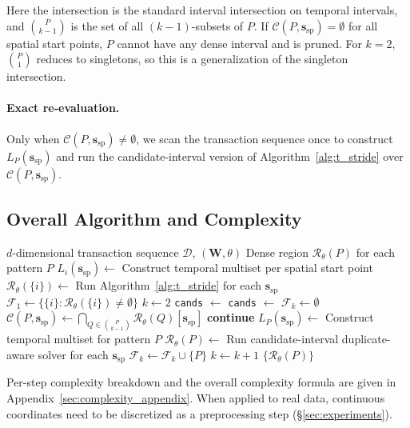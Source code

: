 Here the intersection is the standard interval intersection
on temporal intervals, and $\binom{P}{k-1}$ is the set of all
$(k{-}1)$-subsets of $P$.
If $\mathcal{C}(P,\bm{s}_{\mathrm{sp}})=\emptyset$
for all spatial start points,
$P$ cannot have any dense interval and is pruned.
For $k=2$, $\binom{P}{1}$ reduces to singletons,
so this is a generalization of the singleton intersection.

\paragraph{Exact re-evaluation.}
Only when $\mathcal{C}(P,\bm{s}_{\mathrm{sp}}) \neq \emptyset$,
we scan the transaction sequence once
to construct $L_P(\bm{s}_{\mathrm{sp}})$
and run the candidate-interval version of
Algorithm~\ref{alg:t_stride}
over $\mathcal{C}(P,\bm{s}_{\mathrm{sp}})$.

\subsection{Overall Algorithm and Complexity}\label{sec:complexity}

\begin{algorithm}[t]
\caption{Multi-Dimensional Apriori-Window (interval-based implementation)}
\label{alg:md_apriori}
\begin{algorithmic}[1]
\Require $d$-dimensional transaction sequence $\mathcal{D}$, $(\bm{W}, \theta)$
\Ensure Dense region $\mathcal{R}_\theta(P)$ for each pattern $P$
  \State $L_i(\bm{s}_{\mathrm{sp}}) \leftarrow$ Construct temporal multiset per spatial start point
  \State $\mathcal{R}_\theta(\{i\}) \leftarrow$ Run Algorithm~\ref{alg:t_stride} for each $\bm{s}_{\mathrm{sp}}$
\EndFor
\State $\mathcal{F}_1 \leftarrow \{\{i\} : \mathcal{R}_\theta(\{i\}) \neq \emptyset\}$
\State $k \leftarrow 2$
  \State \texttt{cands} $\leftarrow$ 
  \State \texttt{cands} $\leftarrow$ 
  \State $\mathcal{F}_k \leftarrow \emptyset$
    \State $\mathcal{C}(P,\bm{s}_{\mathrm{sp}}) \leftarrow \bigcap_{Q \in \binom{P}{k-1}}\mathcal{R}_\theta(Q)[\bm{s}_{\mathrm{sp}}]$
      \State \textbf{continue}
    \EndIf
    \State $L_P(\bm{s}_{\mathrm{sp}}) \leftarrow$ Construct temporal multiset for pattern $P$
    \State $\mathcal{R}_\theta(P) \leftarrow$ Run candidate-interval duplicate-aware solver for each $\bm{s}_{\mathrm{sp}}$
      \State $\mathcal{F}_k \leftarrow \mathcal{F}_k \cup \{P\}$
    \EndIf
  \EndFor
  \State $k \leftarrow k + 1$
\EndWhile
\State \Return $\{\mathcal{R}_\theta(P)\}$
\end{algorithmic}
\end{algorithm}

Per-step complexity breakdown and the overall complexity formula
are given in Appendix~\ref{sec:complexity_appendix}.
When applied to real data,
continuous coordinates need to be discretized
as a preprocessing step (\S\ref{sec:experiments}).
